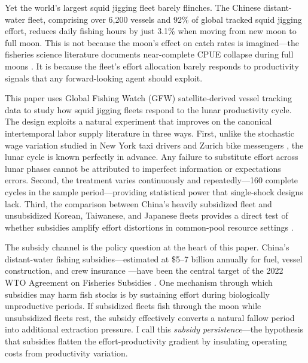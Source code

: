 \documentclass[12pt]{article}
\begin{document}
Yet the world's largest squid jigging fleet barely flinches. The Chinese distant-water fleet, comprising over 6,200 vessels and 92\% of global tracked squid jigging effort, reduces daily fishing hours by just 3.1\% when moving from new moon to full moon. This is not because the moon's effect on catch rates is imagined---the fisheries science literature documents near-complete CPUE collapse during full moons \citep{niu2024, stafford2021}. It is because the fleet's effort allocation barely responds to productivity signals that any forward-looking agent should exploit.

This paper uses Global Fishing Watch (GFW) satellite-derived vessel tracking data \citep{kroodsma2018} to study how squid jigging fleets respond to the lunar productivity cycle. The design exploits a natural experiment that improves on the canonical intertemporal labor supply literature in three ways. First, unlike the stochastic wage variation studied in New York taxi drivers \citep{camerer1997, farber2005, farber2015} and Zurich bike messengers \citep{fehr2007}, the lunar cycle is known perfectly in advance. Any failure to substitute effort across lunar phases cannot be attributed to imperfect information or expectations errors. Second, the treatment varies continuously and repeatedly---160 complete cycles in the sample period---providing statistical power that single-shock designs lack. Third, the comparison between China's heavily subsidized fleet and unsubsidized Korean, Taiwanese, and Japanese fleets provides a direct test of whether subsidies amplify effort distortions in common-pool resource settings \citep{gordon1954, clark1973}.

The subsidy channel is the policy question at the heart of this paper. China's distant-water fishing subsidies---estimated at \$5--7 billion annually for fuel, vessel construction, and crew insurance \citep{sala2018, sumaila2019, chen2020}---have been the central target of the 2022 WTO Agreement on Fisheries Subsidies \citep{wto2022}. One mechanism through which subsidies may harm fish stocks is by sustaining effort during biologically unproductive periods. If subsidized fleets fish through the moon while unsubsidized fleets rest, the subsidy effectively converts a natural fallow period into additional extraction pressure. I call this \textit{subsidy persistence}---the hypothesis that subsidies flatten the effort-productivity gradient by insulating operating costs from productivity variation.
\end{document}
